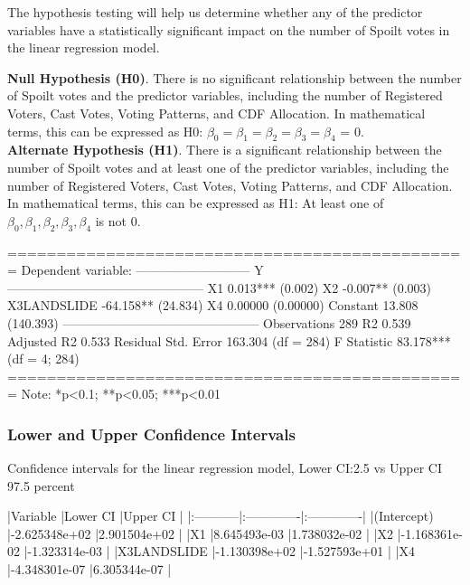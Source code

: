 \documentclass[fleqn,a4paper,12pt]{article}
\begin{document}
The hypothesis testing will help us determine whether any of the predictor variables have a statistically significant impact on the number of Spoilt votes in the linear regression model.
 
\textbf{Null Hypothesis (H0)}. There is no significant relationship between the number of Spoilt votes and the predictor variables, including the number of Registered Voters, Cast Votes, Voting Patterns, and CDF Allocation. In mathematical terms, this can be expressed as H0: $\beta_0 = \beta_1 = \beta_2 = \beta_3 = \beta_4$ = 0.\\
\textbf{Alternate Hypothesis (H1)}. There is a significant relationship between the number of Spoilt votes and at least one of the predictor variables, including the number of Registered Voters, Cast Votes, Voting Patterns, and CDF Allocation. In mathematical terms, this can be expressed as H1: At least one of $\beta_0, \beta_1, \beta_2, \beta_3, \beta_4$ is not 0.



\begin{Schunk}
\begin{Soutput}
===============================================
                        Dependent variable:    
                    ---------------------------
                                 Y             
-----------------------------------------------
X1                       0.013*** (0.002)      
X2                       -0.007** (0.003)      
X3LANDSLIDE             -64.158** (24.834)     
X4                       0.00000 (0.00000)     
Constant                 13.808 (140.393)      
-----------------------------------------------
Observations                    289            
R2                             0.539           
Adjusted R2                    0.533           
Residual Std. Error     163.304 (df = 284)     
F Statistic           83.178*** (df = 4; 284)  
===============================================
Note:               *p<0.1; **p<0.05; ***p<0.01
\end{Soutput}
\end{Schunk}
\subsubsection{Lower and Upper Confidence Intervals}

Confidence intervals for the linear regression model, Lower CI:2.5 vs Upper CI 97.5 percent

\begin{Schunk}
\begin{Soutput}
|Variable    |Lower CI      |Upper CI      |
|:-----------|:-------------|:-------------|
|(Intercept) |-2.625348e+02 |2.901504e+02  |
|X1          |8.645493e-03  |1.738032e-02  |
|X2          |-1.168361e-02 |-1.323314e-03 |
|X3LANDSLIDE |-1.130398e+02 |-1.527593e+01 |
|X4          |-4.348301e-07 |6.305344e-07  |
\end{Soutput}
\end{Schunk}
\end{document}
